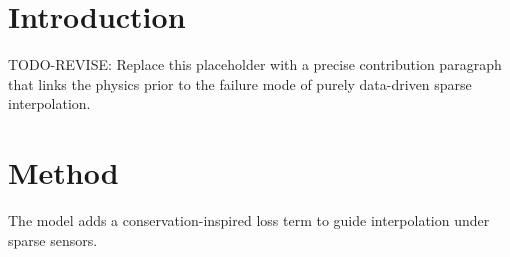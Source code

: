 \section{Introduction}
TODO-REVISE: Replace this placeholder with a precise contribution paragraph that links the physics prior to the failure mode of purely data-driven sparse interpolation.

\section{Method}
The model adds a conservation-inspired loss term to guide interpolation under sparse sensors.
